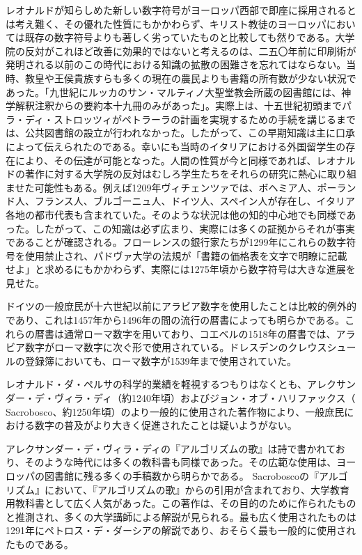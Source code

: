 \documentclass[a4paper,11pt,openany]{ltjsbook}
\begin{document}
レオナルドが知らしめた新しい数字符号がヨーロッパ西部で即座に採用されるとは考え難く、その優れた性質にもかかわらず、キリスト教徒のヨーロッパにおいては既存の数字符号よりも著しく劣っていたものと比較しても然りである。大学院の反対がこれほど改善に効果的ではないと考えるのは、二五〇年前に印刷術が発明される以前のこの時代における知識の拡散の困難さを忘れてはならない。当時、教皇や王侯貴族すらも多くの現在の農民よりも書籍の所有数が少ない状況であった。「九世紀にルッカのサン・マルティノ大聖堂教会所蔵の図書館には、神学解釈注釈からの要約本十九冊のみがあった」。実際上は、十五世紀初頭までパラ・ディ・ストロッツィがペトラーラの計画を実現するための手続を講じるまでは、公共図書館の設立が行われなかった。したがって、この早期知識は主に口承によって伝えられたのである。幸いにも当時のイタリアにおける外国留学生の存在により、その伝達が可能となった。人間の性質が今と同様であれば、レオナルドの著作に対する大学院の反対はむしろ学生たちをそれらの研究に熱心に取り組ませた可能性もある。例えば1209年ヴィチェンツァでは、ボヘミア人、ポーランド人、フランス人、ブルゴーニュ人、ドイツ人、スペイン人が存在し、イタリア各地の都市代表も含まれていた。そのような状況は他の知的中心地でも同様であった。したがって、この知識は必ず広まり、実際には多くの証拠からそれが事実であることが確認される。フローレンスの銀行家たちが1299年にこれらの数字符号を使用禁止され、パドヴァ大学の法規が「書籍の価格表を文字で明瞭に記載せよ」と求めるにもかかわらず、実際には1275年頃から数字符号は大きな進展を見せた。

ドイツの一般庶民が十六世紀以前にアラビア数字を使用したことは比較的例外的であり、これは1457年から1496年の間の流行の暦書によっても明らかである。これらの暦書は通常ローマ数字を用いており、コエベルの1518年の暦書では、アラビア数字がローマ数字に次ぐ形で使用されている。ドレスデンのクレウスシュールの登録簿においても、ローマ数字が1539年まで使用されていた。

レオナルド・ダ・ペルサの科学的業績を軽視するつもりはなくとも、アレクサンダー・デ・ヴィラ・ディ（約1240年頃）およびジョン・オブ・ハリファックス（ Sacrobosco、約1250年頃）のより一般的に使用された著作物により、一般庶民における数字の普及がより大きく促進されたことは疑いようがない。

アレクサンダー・デ・ヴィラ・ディの『アルゴリズムの歌』は詩で書かれており、そのような時代には多くの教科書も同様であった。その広範な使用は、ヨーロッパの図書館に残る多くの手稿数から明らかである。 Sacroboscoの『アルゴリズム』において、『アルゴリズムの歌』からの引用が含まれており、大学教育用教科書として広く人気があった。この著作は、その目的のために作られたものと推測され、多くの大学講師による解説が見られる。最も広く使用されたものは1291年にペトロス・デ・ダーシアの解説であり、おそらく最も一般的に使用されたものである。
\end{document}

